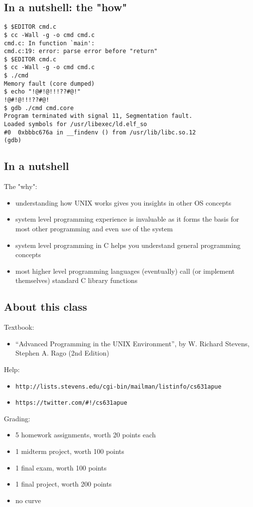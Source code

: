 \documentclass[xga]{xdvislides}
\begin{document}
\subsection{In a nutshell: the "how"}
\begin{verbatim}
$ $EDITOR cmd.c
$ cc -Wall -g -o cmd cmd.c
cmd.c: In function `main':
cmd.c:19: error: parse error before "return"
$ $EDITOR cmd.c
$ cc -Wall -g -o cmd cmd.c
$ ./cmd
Memory fault (core dumped)
$ echo "!@#!@!!!??#@!"
!@#!@!!!??#@!
$ gdb ./cmd cmd.core
Program terminated with signal 11, Segmentation fault.
Loaded symbols for /usr/libexec/ld.elf_so
#0  0xbbbc676a in __findenv () from /usr/lib/libc.so.12
(gdb)
\end{verbatim}

\subsection{In a nutshell}
The "why":
\begin{itemize}
	\item understanding how UNIX works gives you insights in other OS concepts
	\item system level programming experience is invaluable as it
		forms the basis for most other programming and even {\em
		use} of the system
	\item system level programming in C helps you understand general
		programming concepts
	\item most higher level programming languages (eventually) call
		(or implement themselves) standard C library functions
\end{itemize}

\subsection{About this class}
Textbook:
\begin{itemize}
	\item ``Advanced Programming in the UNIX Environment'', by
		W. Richard Stevens, Stephen A. Rago (2nd Edition)
\end{itemize}
\addvspace{.5in}
Help:
\begin{itemize}
	\item \verb+http://lists.stevens.edu/cgi-bin/mailman/listinfo/cs631apue+
	\item \verb+https://twitter.com/#!/cs631apue+
\end{itemize}
\addvspace{.5in}

Grading:
\begin{itemize}
	\item 5 homework assignments, worth 20 points each
	\item 1 midterm project, worth 100 points
	\item 1 final exam, worth 100 points
	\item 1 final project, worth 200 points
	\item no curve
\end{itemize}
\end{document}
